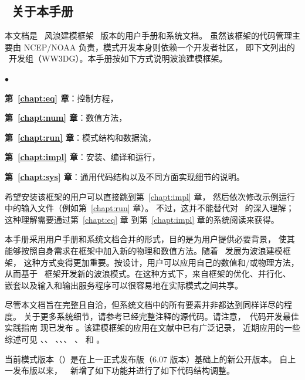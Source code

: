 \vssub
\subsection{~关于本手册}
\vssub

本文档是 \ww\ 风浪建模框架 \WWver\ 版本的用户手册和系统文档。
虽然该框架的代码管理主要由 NCEP/NOAA 负责，模式开发本身则依赖一个开发者社区，
即下文列出的 \ws\ 开发组（WW3DG）。本手册按如下方式说明波浪建模框架。

\begin{list}{$\bullet$}{\rightmargin 5mm \parsep 0mm \itemsep 0mm}
\item \textbf{第~\ref{chapt:eq} 章}：控制方程，
\item \textbf{第~\ref{chapt:num} 章}：数值方法，
\item \textbf{第~\ref{chapt:run} 章}：模式结构和数据流，
\item \textbf{第~\ref{chapt:impl} 章}：安装、编译和运行，
\item \textbf{第~\ref{chapt:sys} 章}：通用代码结构以及不同方面实现细节的说明。
\end{list}

希望安装该框架的用户可以直接跳到第~\ref{chapt:impl} 章，
然后依次修改示例运行中的输入文件（例如第~\ref{chapt:run} 章）。
不过，这并不能替代对 \ws\ 的深入理解；这种理解需要通过第~\ref{chapt:eq} 章
到第~\ref{chapt:impl} 章的系统阅读来获得。

本手册采用用户手册和系统文档合并的形式，目的是为用户提供必要背景，
使其能够按照自身需求在框架中加入新的物理和数值方法。随着 \ws\ 发展为波浪建模框架，
这种方式变得更加重要。按设计，用户可以应用自己的数值和/或物理方法，
从而基于 \ws\ 框架开发新的波浪模式。在这种方式下，来自框架的优化、并行化、
嵌套以及输入和输出服务程序可以很容易地在实际模式之间共享。

尽管本文档旨在完整且自洽，但系统文档中的所有要素并非都达到同样详尽的程度。
关于更多系统细节，请参考已经完整注释的源代码。请注意，\ws\ 代码开发最佳实践指南
现已发布 \citep{tol:MMAB10a, tol:MMAB14b}。该建模框架的应用在文献中已有广泛记录，
近期应用的一些综述可见 \cite{tol:WaF02}、\cite{art:HET09}、
\cite{art:CET13a}、\cite{art:AET13}、\cite{art:RET14}、
\cite{art:LiET14}、\cite{art:RAR14} 和 \cite{art:ZET18}。

\vspace{\baselineskip}
\noindent
当前模式版本（\WWver）是在上一正式发布版（6.07 版本）基础上的新公开版本。
自上一发布版以来，\ws\ \WWver\ 新增了如下功能并进行了如下代码结构调整。

